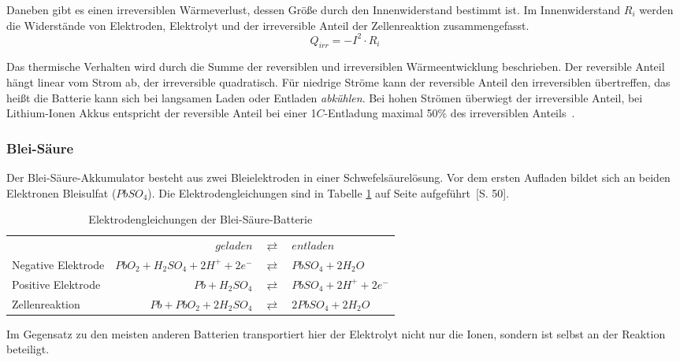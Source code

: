 Daneben gibt es einen irreversiblen Wärmeverlust, dessen Größe durch den Innenwiderstand bestimmt ist. Im Innenwiderstand $R_i$ werden die Widerstände von Elektroden, Elektrolyt und der irreversible Anteil der Zellenreaktion zusammengefasst.
\begin{equation}\label{gl_innenwiderstand}
Q_{irr}=-I^2\cdot R_i
\end{equation}

Das thermische Verhalten wird durch die Summe der reversiblen und irreversiblen Wärmeentwicklung beschrieben. Der reversible Anteil hängt linear vom Strom ab, der irreversible quadratisch. Für niedrige Ströme kann der reversible Anteil den irreversiblen übertreffen, das heißt die Batterie kann sich bei langsamen Laden oder Entladen \emph{abkühlen}. Bei hohen Strömen überwiegt der irreversible Anteil, bei Lithium-Ionen Akkus entspricht der reversible Anteil bei einer 1$C$-Entladung maximal 50\% des irreversiblen Anteils~\cite{Viswanathan20103720}.


\subsubsection{Blei-Säure}
Der Blei-Säure-Akkumulator besteht aus zwei Bleielektroden in einer Schwefelsäurelösung. Vor dem ersten Aufladen bildet sich an beiden Elektronen Bleisulfat ($PbSO_4$). Die Elektrodengleichungen sind in Tabelle \ref{Pb} auf Seite \pageref{Pb} aufgeführt~\cite{KiehneBattery}[S. 50].

\begin{table}\centering
	\begin{tabularx}{\linewidth}{XrcX}
		\toprule
		&                       $geladen$ & $\rightleftarrows$ & $entladen$             \\
		Negative Elektrode & $PbO_2 + H_2SO_4 + 2H^+ + 2e^-$ & $\rightleftarrows$ & $PbSO_4 + 2H_2O$       \\
		Positive Elektrode &                $Pb + H_2SO_4$ & $\rightleftarrows$ & $PbSO_4 + 2H^+ + 2e^-$ \\ \midrule
		Zellenreaktion     &         $Pb + PbO_2 + 2H_2SO_4$ & $\rightleftarrows$ & $2PbSO_4 + 2H_2O$      \\ \bottomrule
	\end{tabularx}
	\caption{Elektrodengleichungen der Blei-Säure-Batterie}
	\label{Pb}
\end{table}

Im Gegensatz zu den meisten anderen Batterien transportiert hier der Elektrolyt nicht nur die Ionen, sondern ist selbst an der Reaktion beteiligt.

